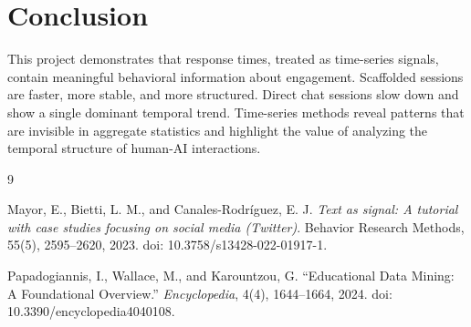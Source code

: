 \documentclass[10pt]{article}
\begin{document}
\section{Conclusion}

This project demonstrates that response times, treated as time-series signals, contain meaningful behavioral information about engagement. Scaffolded sessions are faster, more stable, and more structured. Direct chat sessions slow down and show a single dominant temporal trend. Time-series methods reveal patterns that are invisible in aggregate statistics and highlight the value of analyzing the temporal structure of human-AI interactions.


\footnotesize

\begin{thebibliography}{9}


Mayor, E., Bietti, L. M., and Canales-Rodr{\'i}guez, E. J. 
\textit{Text as signal: A tutorial with case studies focusing on social media (Twitter)}. 
Behavior Research Methods, 55(5), 2595--2620, 2023. 
doi: 10.3758/s13428-022-01917-1.

Papadogiannis, I., Wallace, M., and Karountzou, G.
``Educational Data Mining: A Foundational Overview.''
\textit{Encyclopedia}, 4(4), 1644--1664, 2024.
doi: 10.3390/encyclopedia4040108.


\end{thebibliography}
\vspace{-1em}
\end{document}
